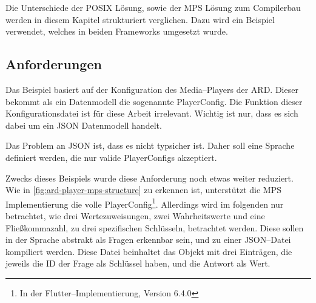 Die Unterschiede der \ac{POSIX} Lösung, sowie der \ac{MPS} Lösung zum Compilerbau werden in diesem Kapitel strukturiert verglichen.
Dazu wird ein Beispiel verwendet, welches in beiden Frameworks umgesetzt wurde.

\subsection{Anforderungen}\label{subsec:anforderungen2}
Das Beispiel basiert auf der Konfiguration des Media--Players der \ac{ARD}.
Dieser bekommt als ein Datenmodell die sogenannte {\ttfamily PlayerConfig}.
Die Funktion dieser Konfigurationsdatei ist für diese Arbeit irrelevant.
Wichtig ist nur, dass es sich dabei um ein \ac{JSON} Datenmodell handelt.

Das Problem an \ac{JSON} ist, dass es nicht typsicher ist.
Daher soll eine Sprache definiert werden, die nur valide {\ttfamily PlayerConfig}s akzeptiert.

Zwecks dieses Beispiels wurde diese Anforderung noch etwas weiter reduziert.
Wie in \autoref{fig:ard-player-mps-structure} zu erkennen ist, unterstützt die \ac{MPS} Implementierung die volle {\ttfamily PlayerConfig}\footnote{In der Flutter--Implementierung, Version 6.4.0}.
Allerdings wird im folgenden nur betrachtet, wie drei Wertezuweisungen, zwei Wahrheitswerte und eine Fließkommazahl, zu drei spezifischen Schlüsseln, betrachtet werden.
Diese sollen in der Sprache abstrakt als Fragen erkennbar sein, und zu einer \ac{JSON}--Datei kompiliert werden.
Diese Datei beinhaltet das Objekt mit drei Einträgen, die jeweils die \ac{ID} der Frage als Schlüssel haben, und die Antwort als Wert.

